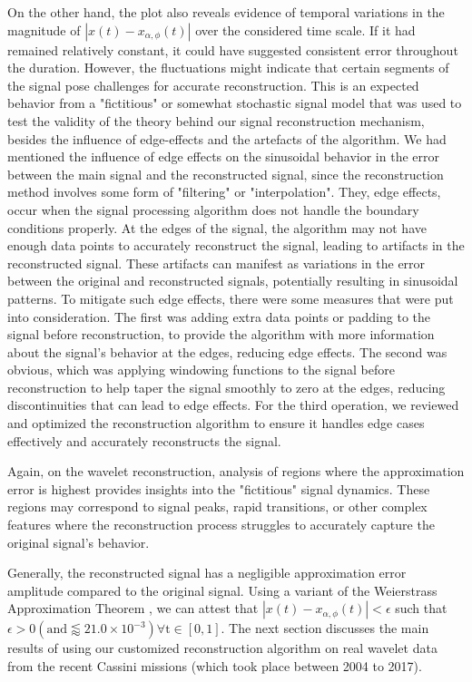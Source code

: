 \documentclass{article}
\begin{document}
On the other hand, the plot also reveals evidence of temporal variations in the magnitude of $|x(t)-x_{\alpha,\phi}(t)|$ over the considered time scale. If it had remained relatively constant, it could have suggested consistent error throughout the duration. However, the fluctuations might indicate that certain segments of the signal pose challenges for accurate reconstruction. This is an expected behavior from a "fictitious" or somewhat stochastic signal model that was used to test the validity of the theory behind our signal reconstruction mechanism, besides the influence of edge-effects and the artefacts of the algorithm. We had mentioned the influence of edge effects on the sinusoidal behavior in the error between the main signal and the reconstructed signal, since the reconstruction method involves some form of "filtering" or "interpolation". They, edge effects, occur when the signal processing algorithm does not handle the boundary conditions properly. At the edges of the signal, the algorithm may not have enough data points to accurately reconstruct the signal, leading to artifacts in the reconstructed signal. These artifacts can manifest as variations in the error between the original and reconstructed signals, potentially resulting in sinusoidal patterns. To mitigate such edge effects, there were some measures that were put into consideration. The first was adding extra data points or padding to the signal before reconstruction, to provide the algorithm with more information about the signal's behavior at the edges, reducing edge effects. The second was obvious, which was applying windowing functions to the signal before reconstruction to help taper the signal smoothly to zero at the edges, reducing discontinuities that can lead to edge effects. For the third operation, we reviewed and optimized the reconstruction algorithm to ensure it handles edge cases effectively and accurately reconstructs the signal.

Again, on the wavelet reconstruction, analysis of regions where the approximation error is highest provides insights into the "fictitious" signal dynamics. These regions may correspond to signal peaks, rapid transitions, or other complex features where the reconstruction process struggles to accurately capture the original signal's behavior.

Generally, the reconstructed signal has a negligible approximation error amplitude compared to the original signal. Using a variant of the Weierstrass Approximation Theorem \cite{pereyra2012harmonic}, we can attest that $|x(t)-x_{\alpha,\phi}(t)| < \epsilon$ such that $\epsilon > 0  (\text{and} \lessapprox 21.0 \times 10^{-3})  \forall  \text{t} \in [0,1]$. The next section discusses the main results of using our customized reconstruction algorithm on real wavelet data from the recent Cassini missions (which took place between 2004 to 2017).  
\end{document}
